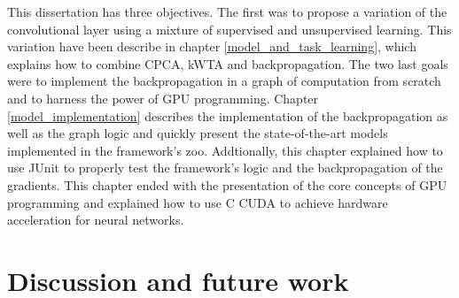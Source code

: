 \documentclass[11pt]{report}
\begin{document}
This dissertation has three objectives. The first was to propose a variation of the convolutional layer using a mixture of supervised and unsupervised learning. This variation have been describe in chapter \ref{model_and_task_learning}, which explains how to combine CPCA, kWTA and backpropagation. The two last goals were to implement the backpropagation in a graph of computation from scratch and to harness the power of GPU programming. Chapter \ref{model_implementation} describes the implementation of the backpropagation as well as the graph logic and quickly present the state-of-the-art models implemented in the framework's zoo. Addtionally, this chapter explained how to use JUnit to properly test the framework's logic and the backpropagation of the gradients. This chapter ended with the presentation of the core concepts of GPU programming and explained how to use C CUDA to achieve hardware acceleration for neural networks. 

\section{Discussion and future work}
\end{document}
